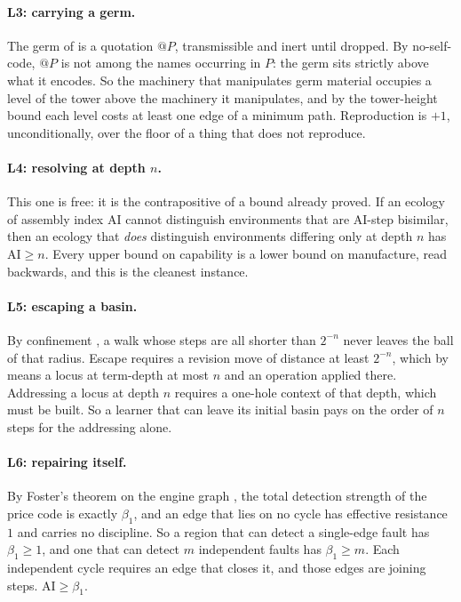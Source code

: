 \documentclass[11pt]{article}
\makeatletter
\theoremstyle{plain}
\theoremstyle{definition}
\theoremstyle{remark}
\newcommand{\quo}[1]{@#1}
\newcommand{\AI}{\mathrm{AI}}
\newcommand{\bt}{\beta_1}
\makeatother
\begin{document}
\paragraph{L3: carrying a germ.}
The germ of \cite[\S11]{scientist} is a quotation $\quo{P}$, transmissible
and inert until dropped. By no-self-code, $\quo{P}$ is not among the names
occurring in $P$: the germ sits strictly above what it encodes. So the
machinery that manipulates germ material occupies a level of the tower
above the machinery it manipulates, and by the tower-height bound each
level costs at least one edge of a minimum path. Reproduction is $+1$,
unconditionally, over the floor of a thing that does not reproduce.

\paragraph{L4: resolving at depth $n$.}
This one is free: it is the contrapositive of a bound already proved. If
an ecology of assembly index $\AI$ cannot distinguish environments that
are $\AI$-step bisimilar, then an ecology that \emph{does} distinguish
environments differing only at depth $n$ has $\AI \ge n$. Every upper
bound on capability is a lower bound on manufacture, read backwards, and
this is the cleanest instance.

\paragraph{L5: escaping a basin.}
By confinement \cite[Prop.~12]{scientist}, a walk whose steps are all
shorter than $2^{-n}$ never leaves the ball of that radius. Escape
requires a revision move of distance at least $2^{-n}$, which by
\cite[Def.~14]{scientist} means a locus at term-depth at most $n$ and an
operation applied there. Addressing a locus at depth $n$ requires a
one-hole context of that depth, which must be built. So a learner that can
leave its initial basin pays on the order of $n$ steps for the addressing
alone.

\paragraph{L6: repairing itself.}
By Foster's theorem on the engine graph \cite[\S6]{engine}, the total
detection strength of the price code is exactly $\bt$, and an edge that
lies on no cycle has effective resistance $1$ and carries no discipline.
So a region that can detect a single-edge fault has $\bt \ge 1$, and one
that can detect $m$ independent faults has $\bt \ge m$. Each independent
cycle requires an edge that closes it, and those edges are joining steps.
$\AI \ge \bt$.
\end{document}
